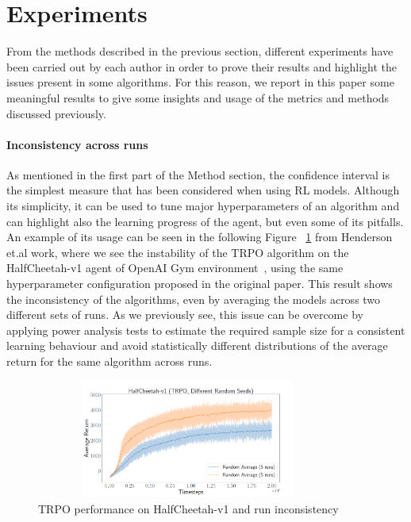 \documentclass{article}
\begin{document}
\section{Experiments}
From the methods described in the previous section, different experiments have been carried out by each author in order to prove their results and highlight the issues present in some algorithms. For this reason, we report in this paper some meaningful results to give some insights and usage of the metrics and methods discussed previously.
\paragraph{Inconsistency across runs}
As mentioned in the first part of the Method section, the confidence interval is the simplest measure that has been considered when using RL models. Although its simplicity, it can be used to tune major hyperparameters of an algorithm and can highlight also the learning progress of the agent, but even some of its pitfalls. An example of its usage can be seen in the following Figure ~\ref{fig:sample_size} from Henderson et.al work, where we see the instability of the TRPO \cite{TRPO} algorithm on the HalfCheetah-v1 agent of OpenAI Gym environment~\cite{OpenAI}, using the same hyperparameter configuration proposed in the original paper. This result shows the inconsistency of the algorithms, even by averaging the models across two different sets of runs. As we previously see, this issue can be overcome by applying power analysis tests to estimate the required sample size for a consistent learning behaviour and avoid statistically different distributions of the average return for the same algorithm across runs.
\begin{figure}[!]
	\centering
	\includegraphics[width=10cm, height=3.9cm]{./images/sample_size_dist.png}
	\caption{TRPO performance on HalfCheetah-v1 and run inconsistency~\cite{DRL01}}
	\label{fig:sample_size}
\end{figure}
\end{document}
